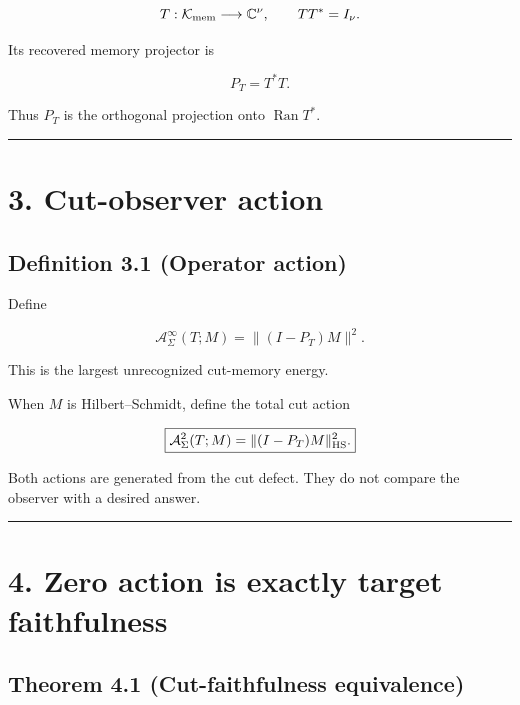 \[
T:\mathcal K_{\rm mem}\longrightarrow\mathbb C^\nu,
\qquad
TT^*=I_\nu.
\]

Its recovered memory projector is

\[
P_T=T^*T.
\]

Thus \(P_T\) is the orthogonal projection onto \(\operatorname{Ran}T^*\).

\begin{center}\rule{0.5\linewidth}{0.5pt}\end{center}

\hypertarget{cut-observer-action}{%
\section{3. Cut-observer action}\label{cut-observer-action}}

\hypertarget{definition-3.1-operator-action}{%
\subsection{Definition 3.1 (Operator action)}\label{definition-3.1-operator-action}}

Define

\[
\boxed{
\mathcal A_\Sigma^{\infty}(T;M)
=
\|(I-P_T)M\|^2.
}
\]

This is the largest unrecognized cut-memory energy.

When \(M\) is Hilbert--Schmidt, define the total cut action

\[
\boxed{
\mathcal A_\Sigma^{2}(T;M)
=
\|(I-P_T)M\|_{\rm HS}^2.
}
\]

Both actions are generated from the cut defect. They do not compare the
observer with a desired answer.

\begin{center}\rule{0.5\linewidth}{0.5pt}\end{center}

\hypertarget{zero-action-is-exactly-target-faithfulness}{%
\section{4. Zero action is exactly target faithfulness}\label{zero-action-is-exactly-target-faithfulness}}

\hypertarget{theorem-4.1-cut-faithfulness-equivalence}{%
\subsection{Theorem 4.1 (Cut-faithfulness equivalence)}\label{theorem-4.1-cut-faithfulness-equivalence}}

